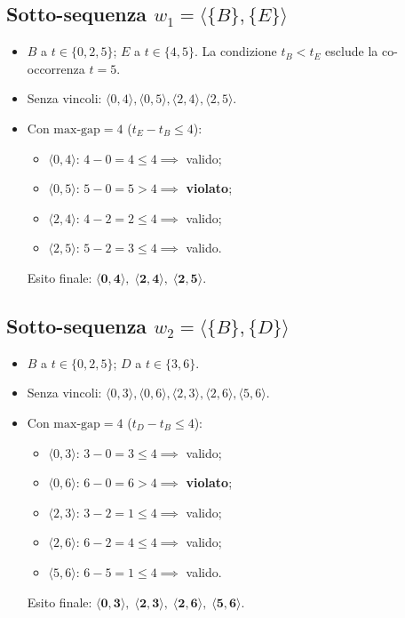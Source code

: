 \subsection{Sotto-sequenza \texorpdfstring{$w_1 = \langle \{B\}, \{E\} \rangle$}{w1}}
\begin{itemize}
    \item $B$ a $t \in \{0, 2, 5\}$; $E$ a $t \in \{4, 5\}$. La condizione $t_B < t_E$ esclude la co-occorrenza $t=5$.
    \item Senza vincoli: $\langle 0, 4 \rangle, \langle 0, 5 \rangle, \langle 2, 4 \rangle, \langle 2, 5 \rangle$.
    \item Con $\text{max-gap} = 4$ ($t_E - t_B \le 4$):
    \begin{itemize}
        \item $\langle 0, 4 \rangle$: $4 - 0 = 4 \le 4 \implies$ valido;
        \item $\langle 0, 5 \rangle$: $5 - 0 = 5 > 4 \implies$ \textbf{violato};
        \item $\langle 2, 4 \rangle$: $4 - 2 = 2 \le 4 \implies$ valido;
        \item $\langle 2, 5 \rangle$: $5 - 2 = 3 \le 4 \implies$ valido.
    \end{itemize}
    Esito finale: $\mathbf{\langle 0, 4 \rangle, \; \langle 2, 4 \rangle, \; \langle 2, 5 \rangle}$.
\end{itemize}

\FloatBarrier
\subsection{Sotto-sequenza \texorpdfstring{$w_2 = \langle \{B\}, \{D\} \rangle$}{w2}}
\begin{itemize}
    \item $B$ a $t \in \{0, 2, 5\}$; $D$ a $t \in \{3, 6\}$.
    \item Senza vincoli: $\langle 0, 3 \rangle, \langle 0, 6 \rangle, \langle 2, 3 \rangle, \langle 2, 6 \rangle, \langle 5, 6 \rangle$.
    \item Con $\text{max-gap} = 4$ ($t_D - t_B \le 4$):
    \begin{itemize}
        \item $\langle 0, 3 \rangle$: $3 - 0 = 3 \le 4 \implies$ valido;
        \item $\langle 0, 6 \rangle$: $6 - 0 = 6 > 4 \implies$ \textbf{violato};
        \item $\langle 2, 3 \rangle$: $3 - 2 = 1 \le 4 \implies$ valido;
        \item $\langle 2, 6 \rangle$: $6 - 2 = 4 \le 4 \implies$ valido;
        \item $\langle 5, 6 \rangle$: $6 - 5 = 1 \le 4 \implies$ valido.
    \end{itemize}
    Esito finale: $\mathbf{\langle 0, 3 \rangle, \; \langle 2, 3 \rangle, \; \langle 2, 6 \rangle, \; \langle 5, 6 \rangle}$.
\end{itemize}


